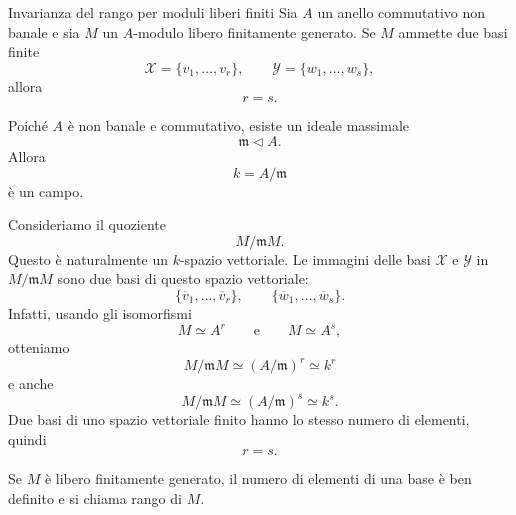 \documentclass[a4paper]{article}
\begin{document}
\begin{radioactive}
\begin{snippetproposition}{Invarianza del rango per moduli liberi finiti}
    Sia \(A\) un anello commutativo non banale e sia \(M\) un \(A\)-modulo libero finitamente generato.
    Se \(M\) ammette due basi finite
    \[
        \mathcal{X}=\{v_1,\ldots,v_r\},
        \qquad
        \mathcal{Y}=\{w_1,\ldots,w_s\},
    \]
    allora
    \[
        r=s.
    \]
\end{snippetproposition}
\end{radioactive}

\begin{radioactive}
\begin{snippetproof}{}
    Poiché \(A\) è non banale e commutativo, esiste un ideale massimale
    \[
        \mathfrak{m}\triangleleft A.
    \]
    Allora
    \[
        k=A/\mathfrak{m}
    \]
    è un campo.

    Consideriamo il quoziente
    \[
        M/\mathfrak{m}M.
    \]
    Questo è naturalmente un \(k\)-spazio vettoriale. Le immagini delle basi \(\mathcal{X}\) e \(\mathcal{Y}\) in \(M/\mathfrak{m}M\) sono due basi di questo spazio vettoriale:
    \[
        \{\overline{v}_1,\ldots,\overline{v}_r\},
        \qquad
        \{\overline{w}_1,\ldots,\overline{w}_s\}.
    \]
    Infatti, usando gli isomorfismi
    \[
        M\simeq A^r
        \qquad
        \text{e}
        \qquad
        M\simeq A^s,
    \]
    otteniamo
    \[
        M/\mathfrak{m}M\simeq (A/\mathfrak{m})^r\simeq k^r
    \]
    e anche
    \[
        M/\mathfrak{m}M\simeq (A/\mathfrak{m})^s\simeq k^s.
    \]
    Due basi di uno spazio vettoriale finito hanno lo stesso numero di elementi, quindi
    \[
        r=s.
    \]
\end{snippetproof}
\end{radioactive}

\begin{radioactive}
\begin{snippetremark}{}
    Se \(M\) è libero finitamente generato, il numero di elementi di una base è ben definito e si chiama rango di \(M\).
\end{snippetremark}
\end{radioactive}
\end{document}
